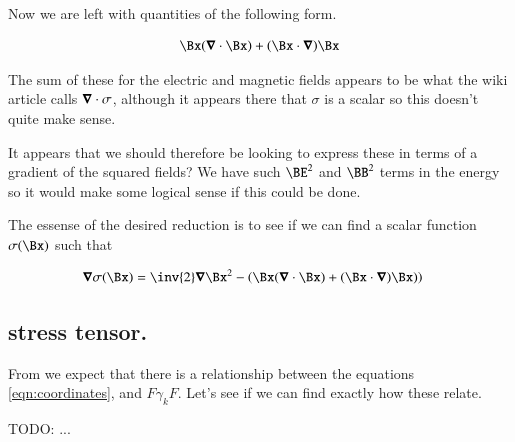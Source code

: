 \documentclass{article}
\begin{document}
Now we are left with quantities of the following form.

\begin{align*}
\Bx (\spacegrad \cdot \Bx) +(\Bx \cdot \spacegrad) \Bx 
\end{align*}

The sum of these for the electric and magnetic fields appears to be what the 
wiki article calls $\boldsymbol{\nabla} \cdot \sigma$, although it appears
there that $\sigma$ is a scalar so this doesn't quite make sense.

It appears that 
we should therefore be looking to
express these in terms of a gradient of the squared fields?  We have such $\BE^2$ and $\BB^2$ terms in the energy so it would make some logical sense if this
could be done.

The essense of the desired reduction is to see if we can find a scalar function $\sigma(\Bx)$ such that

\begin{align*}
\spacegrad \sigma(\Bx) &= \inv{2} \spacegrad \Bx^2 - \left(\Bx (\spacegrad \cdot \Bx) + (\Bx \cdot \spacegrad) \Bx )\right)
\end{align*}

\subsection{ stress tensor. }

From \cite{doran2003gap} we expect that there is a relationship between
the equations \ref{eqn:coordinates}, and $F \gamma_k F$.  Let's see 
if we can find exactly how these relate.



TODO: ...



\end{document}
